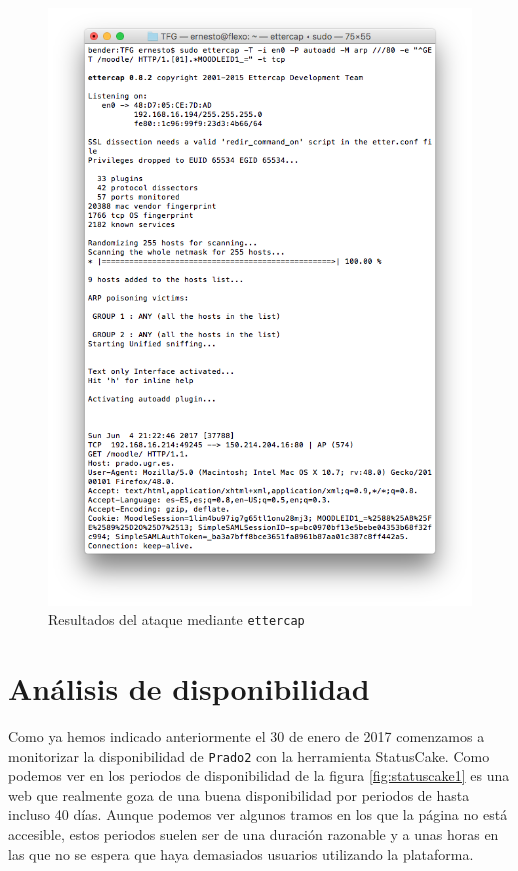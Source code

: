\begin{figure}[H]
\centering
\includegraphics[width=1.0\textwidth]{../screenshots/ettercap}
\caption{Resultados del ataque mediante \texttt{ettercap}}
\label{fig:ettercap}
\end{figure}



\section{Análisis de disponibilidad}

Como ya hemos indicado anteriormente el 30 de enero de 2017 comenzamos a monitorizar la disponibilidad de \texttt{Prado2} con la herramienta StatusCake. Como podemos ver en los periodos de disponibilidad de la figura \ref{fig:statuscake1} es una web que realmente goza de una buena disponibilidad por periodos de hasta incluso 40 días. Aunque podemos ver algunos tramos en los que la página no está accesible, estos periodos suelen ser de una duración razonable y a unas horas en las que no se espera que haya demasiados usuarios utilizando la plataforma.

